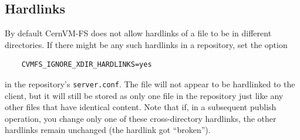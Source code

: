 \subsection{Hardlinks}
By default CernVM-FS does not allow hardlinks of a file to be in different directories.
If there might be any such hardlinks in a repository, set the option
\begin{verbatim}
    CVMFS_IGNORE_XDIR_HARDLINKS=yes
\end{verbatim}
in the repository's \texttt{server.conf}. 
The file will not appear to be hardlinked to the client, but it will still be stored as only one file in the repository just like any other files that have identical content.
Note that if, in a subsequent publish operation, you change only one of these cross-directory hardlinks, the other hardlinks remain unchanged (the hardlink got ``broken'').

